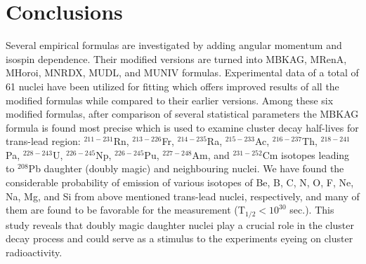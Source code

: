 \documentclass[preprint,10pt]{elsarticle}
\begin{document}
\section{Conclusions}
Several empirical formulas are investigated by adding angular momentum and isospin dependence. Their modified versions are turned into MBKAG, MRenA, MHoroi, MNRDX, MUDL, and MUNIV formulas. Experimental data of a total of 61 nuclei have been utilized for fitting which offers improved results of all the modified formulas while compared to their earlier versions. Among these six modified formulas, after comparison of several statistical parameters the MBKAG formula is found most precise which is used to examine cluster decay half-lives for trans-lead region: $^{211-231}$Rn, $^{213-226}$Fr, $^{214-235}$Ra, $^{215-233}$Ac, $^{216-237}$Th, $^{218-241}$Pa, $^{228-243}$U, $^{226-245}$Np, $^{226-245}$Pu, $^{227-248}$Am, and $^{231-252}$Cm isotopes leading to $^{208}$Pb daughter (doubly magic) and neighbouring nuclei. We have found the considerable probability of emission of various isotopes of Be, B, C, N, O, F, Ne, Na, Mg, and Si from above mentioned trans-lead nuclei, respectively, and many of them are found to be favorable for the measurement (T$_{1/2}<10^{30}$ sec.). This study reveals that doubly magic daughter nuclei play a crucial role in the cluster decay process and could serve as a stimulus to the experiments eyeing on cluster radioactivity.\par
\end{document}
